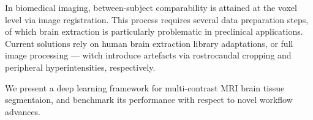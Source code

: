 In biomedical imaging, between-subject comparability is attained at the voxel level via image registration.
This process requires several data preparation steps, of which brain extraction is particularly problematic in preclinical applications.
Current solutions rely on human brain extraction library adaptations, or full image processing — witch introduce artefacts via rostrocaudal cropping and peripheral hyperintensities, respectively.
\vspace{.8em}

We present a deep learning framework for multi-contrast MRI brain tissue segmentaion, and benchmark its performance with respect to novel workflow advances.